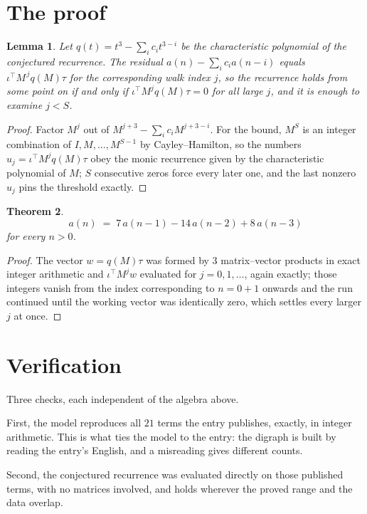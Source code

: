 \documentclass[11pt,a4paper]{article}
\theoremstyle{plain}
\newtheorem{theorem}{Theorem}
\newtheorem{lemma}[theorem]{Lemma}
\theoremstyle{definition}
\begin{document}
\section{The proof}

\begin{lemma}\label{lem:crit}
Let $q(t)=t^{3}-\sum_i c_it^{3-i}$ be the characteristic polynomial of the
conjectured recurrence. The residual $a(n)-\sum_ic_ia(n-i)$ equals
$\iota^{\!\top}M^{\,j}q(M)\tau$ for the corresponding walk index $j$, so the recurrence
holds from some point on if and only if $\iota^{\!\top}M^{j}q(M)\tau=0$ for all large $j$,
and it is enough to examine $j<S$.
\end{lemma}

\begin{proof}
Factor $M^{j}$ out of $M^{j+3}-\sum_ic_iM^{j+3-i}$. For the bound, $M^{S}$
is an integer combination of $I,M,\dots,M^{S-1}$ by Cayley--Hamilton, so the numbers
$u_j=\iota^{\!\top}M^{j}q(M)\tau$ obey the monic recurrence given by the characteristic
polynomial of $M$; $S$ consecutive zeros force every later one, and the last nonzero $u_j$
pins the threshold exactly.
\end{proof}

\begin{theorem}
\[
a(n)\;=\;7\,a(n-1) - 14\,a(n-2) + 8\,a(n-3)
\]
for every $n>0$.
\end{theorem}

\begin{proof}
The vector $w=q(M)\tau$ was formed by $3$ matrix--vector products in exact integer
arithmetic and $\iota^{\!\top}M^{j}w$ evaluated for $j=0,1,\dots$, again exactly; those
integers vanish from the index corresponding to $n=0+1$ onwards and the run continued
until the working vector was identically zero, which settles every larger $j$ at once.
\end{proof}

\section{Verification}

Three checks, each independent of the algebra above.

First, the model reproduces all $21$ terms the entry publishes, exactly, in integer
arithmetic. This is what ties the model to the entry: the digraph is built by reading the
entry's English, and a misreading gives different counts.

Second, the conjectured recurrence was evaluated directly on those published terms, with no
matrices involved, and holds wherever the proved range and the data overlap.
\end{document}
